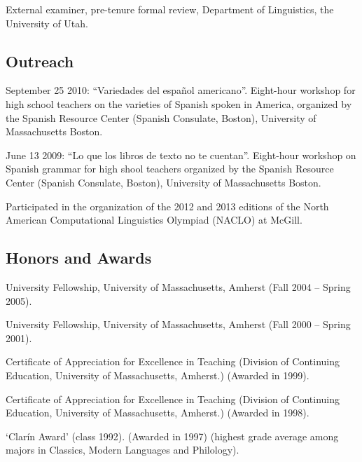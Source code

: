 \documentclass[11pt]{article}
\begin{document}
External examiner, pre-tenure formal review, Department of Linguistics, the University of Utah.


\subsection*{Outreach}


September 25 2010: ``Variedades del espa\~nol americano''. Eight-hour
workshop for high school teachers on the varieties of Spanish spoken in America, organized by the
Spanish Resource Center (Spanish Consulate, Boston), University of Massachusetts Boston.

June 13 2009: ``Lo que los libros de texto no te cuentan''. Eight-hour
workshop  on Spanish grammar for high shool teachers organized by the
Spanish Resource Center (Spanish Consulate, Boston), University of
Massachusetts Boston.

Participated in the organization of the 2012 and 2013 editions of the North
American Computational Linguistics Olympiad (NACLO) at McGill.


\subsection*{Honors and Awards} 

University Fellowship, University of Massachusetts, Amherst (Fall
 2004 -- Spring 2005).

University Fellowship, University of Massachusetts, Amherst (Fall 2000
-- Spring 2001).

Certificate of Appreciation for Excellence in Teaching (Division of
Continuing Education, University of Massachusetts, Amherst.) (Awarded
in 1999).

Certificate of Appreciation for Excellence in Teaching (Division of
Continuing Education, University of Massachusetts, Amherst.) (Awarded
in 1998).

`Clar\'in Award' (class 1992). (Awarded in 1997) (highest grade average among majors in Classics, Modern Languages and Philology).


\end{document}
